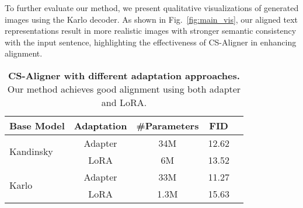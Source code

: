 To further evaluate our method, we present qualitative visualizations of generated images using the Karlo decoder. As shown in Fig.~\ref{fig:main_vis}, our aligned text representations result in more realistic images with stronger semantic consistency with the input sentence, highlighting the effectiveness of CS-Aligner in enhancing alignment.




\begin{table}[t]
\caption{\textbf{CS-Aligner with different adaptation approaches.} Our method achieves good alignment using both adapter and LoRA.}
\vspace{-2mm}
\centering
\begin{tabular}{@{}lcccc@{}}
\toprule
\textbf{Base Model} & \textbf{Adaptation} & \textbf{\#Parameters} & \textbf{FID} \\ \midrule
\multirow{2}{*}{Kandinsky} & Adapter      & 34M   & 12.62 \\
                           & LoRA         & 6M    & 13.52 \\ 
\midrule
\multirow{2}{*}{Karlo}     & Adapter      & 33M   & 11.27 \\ 
                           & LoRA         & 1.3M  & 15.63 \\ 
\bottomrule
\end{tabular}
\vspace{-5mm}
\label{tab:lora_comparison}
\end{table}

